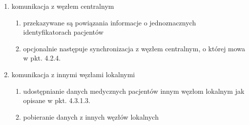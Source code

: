 \documentclass[a4paper]{report}
\begin{document}
\begin{enumerate}
\item komunikacja z węzłem centralnym
  \begin{enumerate}
  \item przekazywane są powiązania informacje o jednoznacznych identyfikatorach pacjentów
  \item opcjonalnie następuje synchronizacja z węzłem centralnym, o której mowa w pkt. 4.2.4.
  \end{enumerate}

\item komunikacja z innymi węzłami lokalnymi
  \begin{enumerate}
  \item udostępnianie danych medycznych pacjentów innym węzłom lokalnym jak opisane w pkt.  4.3.1.3.
  \item pobieranie danych z innych węzłów lokalnych
  \end{enumerate}
\end{enumerate}
\end{document}
